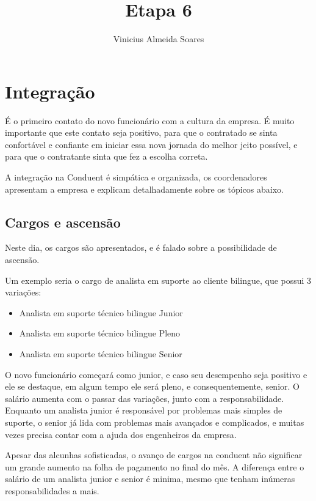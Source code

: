 \documentclass[12pt]{article}
\author{Vinicius Almeida Soares}
\title{Etapa 6}
\begin{document}
\maketitle

\section{Integração}
É o primeiro contato do novo funcionário com a cultura da empresa. É muito importante que este contato seja positivo, para que o contratado se sinta confortável e confiante em iniciar essa nova jornada do melhor jeito possível, e para que o contratante sinta que fez a escolha correta. 

A integração na Conduent é simpática e organizada, os coordenadores apresentam a empresa e explicam detalhadamente sobre os tópicos abaixo.


\subsection{Cargos e ascensão}
Neste dia, os cargos são apresentados, e é falado sobre a possibilidade de ascensão.

Um exemplo seria o cargo de analista em suporte ao cliente bilingue, que possui 3 variações:

\begin{itemize}
\item Analista em suporte técnico bilingue Junior
\item Analista em suporte técnico bilingue Pleno
\item Analista em suporte técnico bilingue Senior
\end{itemize}

\newpage

O novo funcionário começará como junior, e caso seu desempenho seja positivo e ele se destaque, em algum tempo ele será pleno, e consequentemente, senior. O salário aumenta com o passar das variações, junto com a responsabilidade. Enquanto um analista junior é responsável por problemas mais simples de suporte, o senior já lida com problemas mais avançados e complicados, e muitas vezes precisa contar com a ajuda dos engenheiros da empresa.

Apesar das alcunhas sofisticadas, o avanço de cargos na conduent não significar um grande aumento na folha de pagamento no final do mês. A diferença entre o salário de um analista junior e senior é minima, mesmo que tenham inúmeras responsabilidades a mais.
\end{document}
